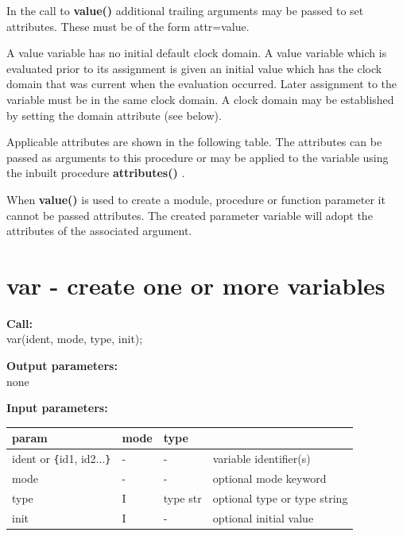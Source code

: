         In the call to {\bf value()} additional trailing arguments may be
        passed to set attributes. These must be of the form attr=value.

        A value variable has no initial default clock domain. A value variable
        which is evaluated prior to its assignment is given an initial value
        which has the clock domain that was current when the evaluation
        occurred. Later assignment to the variable must be in the same clock
        domain. A clock domain may be established by setting the domain
        attribute (see below).
        
        Applicable attributes are shown in the following table. The
        attributes can be passed as arguments to this procedure or may be
        applied to the variable using the inbuilt procedure
        {\bf attributes()} .
        
        When {\bf value()} is used to create a module, procedure or function
        parameter it cannot be passed attributes. The created parameter variable
        will adopt the attributes of the associated argument.

        


    \section{var - create one or more variables}\label{sec:ipvar}
        
        {\bf Call:} \\
        var(ident, mode, type, init);
        
        {\bf Output parameters:} \\
        none
        
        {\bf Input parameters:} \\
        \begin{tabular}{| l | l | l | l |}
        \hline
        param  & mode & type & \\
        \hline \hline
        ident or \verb'{'id1, id2...\verb'}' & - &  -       & variable identifier(s)          \\ \hline
        mode                   & - &  -       & optional mode keyword           \\ \hline
        type                   & I & type str & optional type or type string \\ \hline
        init                   & I &  -       & optional initial value          \\ \hline
        \end{tabular}
        
